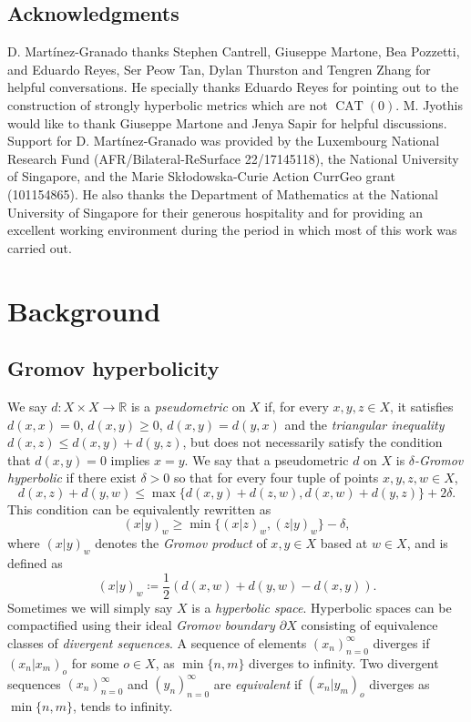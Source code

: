 \documentclass[12pt]{amsart}
\numberwithin{equation}{section}
\numberwithin{figure}{section}
\theoremstyle{definition}
\theoremstyle{plain}
\DeclareMathOperator{\CAT}{CAT}
\begin{document}
\subsection{Acknowledgments}
\label{sec:acknowledgments}
D. Mart\'inez-Granado thanks Stephen Cantrell, Giuseppe Martone, Bea Pozzetti, and Eduardo Reyes, Ser Peow Tan, Dylan Thurston and Tengren Zhang for helpful conversations. He specially thanks Eduardo Reyes for pointing out to the construction of strongly hyperbolic metrics which are not $\CAT(0)$. M. Jyothis would like to thank Giuseppe Martone and Jenya Sapir for helpful discussions. Support for D. Mart\'inez-Granado was provided by the Luxembourg National Research Fund (AFR/Bilateral-ReSurface 22/17145118), the National University of Singapore, and the Marie Skłodowska-Curie Action CurrGeo grant (101154865). He also thanks the Department of Mathematics at the National University of Singapore for their generous hospitality and for providing an excellent working environment during the period in which most of this work was carried out.


\section{Background}
\label{sec:background}

\subsection{Gromov hyperbolicity}

We say $d \colon X \times X \to \mathbb{R}$ is a \emph{pseudometric} on $X$ if, for every $x,y,z \in X$, it satisfies $d(x,x)=0$, $d(x,y) \geq 0$, $d(x,y)=d(y,x)$ and the \emph{triangular inequality} $d(x,z) \leq d(x,y) + d(y,z)$, but does not necessarily satisfy the condition that $d(x,y)=0$ implies $x=y$.
We say that a pseudometric $d$ on $X$ is \emph{$\delta$-Gromov hyperbolic} if there exist $\delta>0$ so that for every four tuple of points $x,y,z,w \in X$,
\begin{equation}
d(x,z)+d(y,w) \leq \max \{ d(x,y)+d(z,w), d(x,w) + d(y,z) \} + 2\delta.
\label{eq:gromov_hyp}
\end{equation}
This condition can be equivalently rewritten as
\[
(x|y)_w \geq \min \{ (x|z)_w, (z|y)_w \}-\delta,
\]
where $(x|y)_w$ denotes the \emph{Gromov product} of $x,y \in X$ based at $w \in X$, and is defined as
\[
(x|y)_w \coloneqq \frac{1}{2}\left( d(x,w)+d(y,w)-d(x,y)\right).
\]
Sometimes we will simply say $X$ is a \emph{hyperbolic space}.
Hyperbolic spaces can be compactified using their ideal \emph{Gromov boundary $\partial X$} consisting of equivalence classes of \emph{divergent sequences}. A sequence of elements $(x_n)_{n=0}^{\infty}$ diverges if $(x_n | x_m)_o$ for some $o \in X$, as $\min \{ n, m\}$ diverges to infinity. 
Two divergent sequences $(x_n)_{n=0}^{\infty}$ and $(y_n)_{n=0}^{\infty}$ are \emph{equivalent} if $(x_n | y_m)_o$ diverges as $\min \{n,m \}$, tends to infinity.
\end{document}
